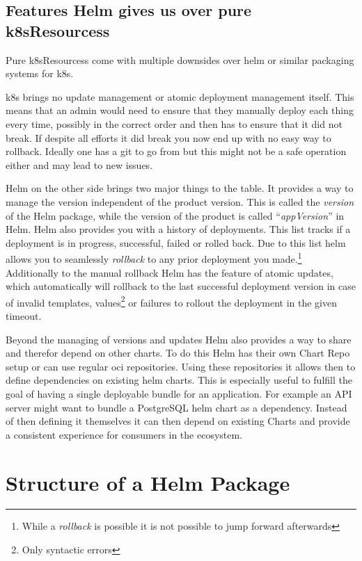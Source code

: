 \documentclass[english,10pt]{scrbook}
\begin{document}
\section{Features Helm gives us over pure \Glspl{k8sResources}}
Pure \Glspl{k8sResources} come with multiple downsides over helm or similar packaging systems for \Gls{k8s}.

\Gls{k8s} brings no update management or atomic deployment management itself.
This means that an admin would need to ensure that they manually deploy each thing every time, possibly in the correct order and then has to ensure that it did not break.
If despite all efforts it did break you now end up with no easy way to rollback.
Ideally one has a git to go from but this might not be a safe operation either and may lead to new issues.

Helm on the other side brings two major things to the table.
It provides a way to manage the version independent of the product version.
This is called the \emph{version} of the Helm package, while the version of the product is called \enquote{\emph{appVersion}} in Helm.
Helm also provides you with a history of deployments.
This list tracks if a deployment is in progress, successful, failed or rolled back.
Due to this list helm allows you to seamlessly \emph{rollback} to any prior deployment you made.\footnote{While a \emph{rollback} is possible it is not possible to jump forward afterwards}
Additionally to the manual rollback Helm has the feature of atomic updates, which automatically will rollback to the last successful deployment version in case of invalid templates, values\footnote{Only syntactic errors} or failures to rollout the deployment in the given timeout.

Beyond the managing of versions and updates Helm also provides a way to share and therefor depend on other charts.
To do this Helm has their own Chart Repo setup or can use regular \gls{oci} repositories.
Using these repositories it allows then to define dependencies on existing helm charts.
This is especially useful to fulfill the goal of having a single deployable bundle for an application.
For example an API server might want to bundle a PostgreSQL helm chart as a dependency.
Instead of then defining it themselves it can then depend on existing Charts and provide a consistent experience for consumers in the ecosystem.

\chapter{Structure of a Helm Package}
\end{document}
